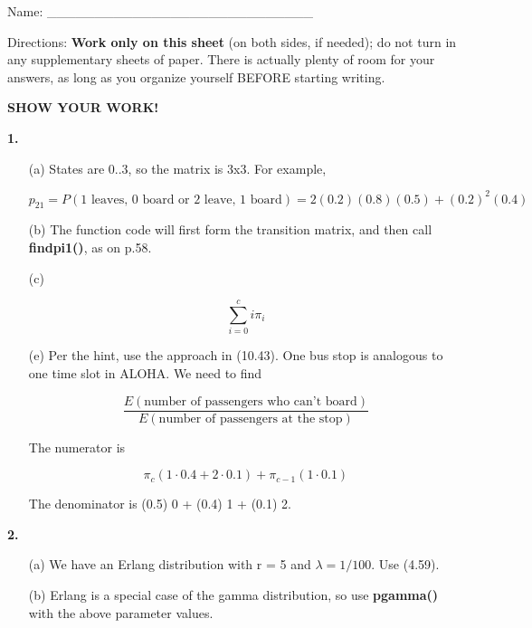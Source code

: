 \documentclass{article}
\begin{document}
\lstset{language=R,basicstyle=\smaller}

Name: \_\_\_\_\_\_\_\_\_\_\_\_\_\_\_\_\_\_\_\_\_\_\_\_\_\_\_\_

Directions: {\bf Work only on this sheet} (on both sides, if needed); do not
turn in any supplementary sheets of paper. There is actually plenty of room
for your answers, as long as you organize yourself BEFORE starting writing.

{\bf \Large SHOW YOUR WORK!}  

{\bf 1.} 

\begin{itemize}

\item [(a)] States are 0..3, so the matrix is 3x3.  For example,

\begin{equation}
p_{21} = P(\textrm{1 leaves, 0 board or 2 leave, 1 board})
= 2(0.2)(0.8)(0.5) + (0.2)^2 (0.4)
\end{equation}

\item [(b)] The function code will first form the transition matrix, and
then call {\bf findpi1()}, as on p.58.

\item [(c)] 

\begin{equation}
\sum_{i=0}^c i \pi_i
\end{equation}

\item [(e)] Per the hint, use the approach in (10.43).  One bus stop is
analogous to one time slot in ALOHA.  We need to find

\begin{equation}
\frac
{E(\textrm{number of passengers who can't board})}
{E(\textrm{number of passengers at the stop})}
\end{equation}

The numerator is 

\begin{equation}
\pi_{c} (1 \cdot 0.4 + 2 \cdot 0.1)  +
\pi_{c-1} (1 \cdot 0.1)  
\end{equation}

The denominator is (0.5) 0 + (0.4) 1 + (0.1) 2.

\end{itemize}

{\bf 2.}

\begin{itemize}

\item [(a)] We have an Erlang distribution with r = 5 and $\lambda = 1/100$.
Use (4.59).

\item [(b)] Erlang is a special case of the gamma distribution, so use
{\bf pgamma()} with the above parameter values.

\end{itemize}
\end{document}
